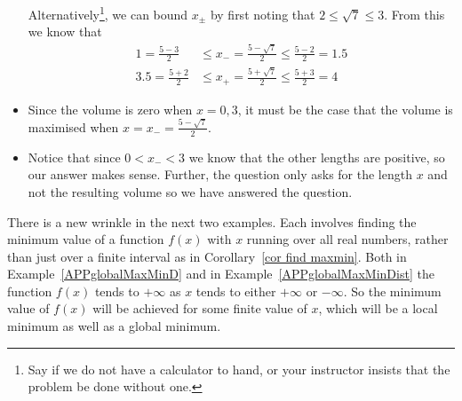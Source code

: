 \begin{eg}
\begin{itemize}
Alternatively\footnote{Say if we do not have a calculator to hand, or your instructor
insists that the problem be done without one.}, we can bound $x_\pm$ by first noting that
$2 \leq \sqrt{7} \leq 3$. From this we know that
\begin{align*}
  1=\frac{5-3}{2} & \leq x_- = \frac{5 - \sqrt{7}}{2} \leq \frac{5-2}{2} = 1.5 \\
  3.5=\frac{5+2}{2} & \leq x_+ = \frac{5 + \sqrt{7}}{2} \leq \frac{5+3}{2} = 4
\end{align*}

\item Since the volume is zero when $x=0,3$, it must be the case that the volume is
maximised when $x = x_- = \frac{5 - \sqrt{7}}{2}$.

\item Notice that since $0 < x_- <3$ we know that the other lengths are positive, so our
answer makes sense. Further, the question only asks for the length $x$ and not the
resulting volume so we have answered the question.
\end{itemize}
\end{eg}

There is a new wrinkle in the next two examples. Each involves finding the
minimum value of a function $f(x)$ with $x$ running over all real numbers,
rather than just over a finite interval as in Corollary~\ref{cor find maxmin}.
Both in Example~\ref{APPglobalMaxMinD} and in Example~\ref{APPglobalMaxMinDist}
the function $f(x)$ tends to $+\infty$ as $x$ tends to either $+\infty$ or
$-\infty$. So the minimum value of $f(x)$ will be achieved for some finite value
of $x$, which will be a local minimum as well as a global minimum.

